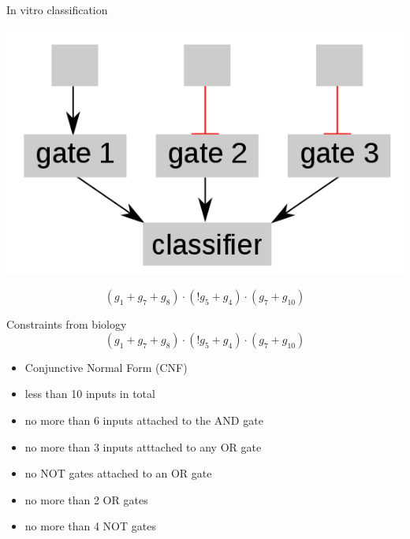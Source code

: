 \documentclass[10pt,dvipsnames]{beamer}
\begin{document}
\begin{frame}{In vitro classification}
\end{frame}


\begin{frame}{}
\begin{center}
\includegraphics[scale=0.25]{classifier.png}
\end{center}
\[(g_1 + g_7 + g_8)\cdot(!g_5 + g_4)\cdot(g_7 + g_{10})\]
\end{frame}

\begin{frame}{Constraints from biology}
\[(g_1 + g_7 + g_8)\cdot(!g_5 + g_4)\cdot(g_7 + g_{10})\]
\begin{itemize}
 \item Conjunctive Normal Form (CNF)
 \item less than 10 inputs in total
 \item no more than 6 inputs attached to the AND gate
 \item no more than 3 inputs atttached to any OR gate
 \item no NOT gates attached to an OR gate
 \item no more than 2 OR gates
 \item no more than 4 NOT gates
\end{itemize}
\end{frame}
\end{document}
